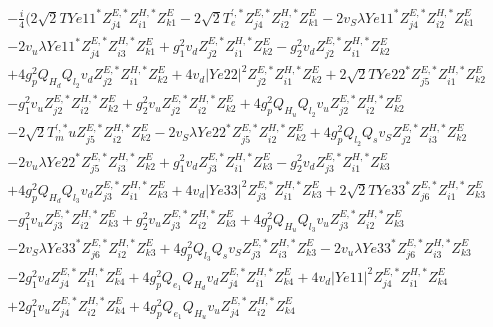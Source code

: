 \begin{align} 
 &-\frac{i}{4} \Big(2 \sqrt{2} TYe11^* Z^{E,*}_{j 4} Z^{H,*}_{i 1} Z_{{k 1}}^{E} -2 \sqrt{2} T^{{\prime},*}_e Z^{E,*}_{j 4} Z^{H,*}_{i 2} Z_{{k 1}}^{E} -2 v_S \lambda Ye11^* Z^{E,*}_{j 4} Z^{H,*}_{i 2} Z_{{k 1}}^{E} \nonumber \\ 
 &-2 v_u \lambda Ye11^* Z^{E,*}_{j 4} Z^{H,*}_{i 3} Z_{{k 1}}^{E} +g_{1}^{2} v_d Z^{E,*}_{j 2} Z^{H,*}_{i 1} Z_{{k 2}}^{E} - g_{2}^{2} v_d Z^{E,*}_{j 2} Z^{H,*}_{i 1} Z_{{k 2}}^{E} \nonumber \\ 
 &+4 g_{p}^{2} Q_{H_d} Q_{l_2} v_d Z^{E,*}_{j 2} Z^{H,*}_{i 1} Z_{{k 2}}^{E} +4 v_d |Ye22|^2 Z^{E,*}_{j 2} Z^{H,*}_{i 1} Z_{{k 2}}^{E} +2 \sqrt{2} TYe22^* Z^{E,*}_{j 5} Z^{H,*}_{i 1} Z_{{k 2}}^{E} \nonumber \\ 
 &- g_{1}^{2} v_u Z^{E,*}_{j 2} Z^{H,*}_{i 2} Z_{{k 2}}^{E} +g_{2}^{2} v_u Z^{E,*}_{j 2} Z^{H,*}_{i 2} Z_{{k 2}}^{E} +4 g_{p}^{2} Q_{H_u} Q_{l_2} v_u Z^{E,*}_{j 2} Z^{H,*}_{i 2} Z_{{k 2}}^{E} \nonumber \\ 
 &-2 \sqrt{2} T^{{\prime},*}_mu Z^{E,*}_{j 5} Z^{H,*}_{i 2} Z_{{k 2}}^{E} -2 v_S \lambda Ye22^* Z^{E,*}_{j 5} Z^{H,*}_{i 2} Z_{{k 2}}^{E} +4 g_{p}^{2} Q_{l_2} Q_s v_S Z^{E,*}_{j 2} Z^{H,*}_{i 3} Z_{{k 2}}^{E} \nonumber \\ 
 &-2 v_u \lambda Ye22^* Z^{E,*}_{j 5} Z^{H,*}_{i 3} Z_{{k 2}}^{E} +g_{1}^{2} v_d Z^{E,*}_{j 3} Z^{H,*}_{i 1} Z_{{k 3}}^{E} - g_{2}^{2} v_d Z^{E,*}_{j 3} Z^{H,*}_{i 1} Z_{{k 3}}^{E} \nonumber \\ 
 &+4 g_{p}^{2} Q_{H_d} Q_{l_3} v_d Z^{E,*}_{j 3} Z^{H,*}_{i 1} Z_{{k 3}}^{E} +4 v_d |Ye33|^2 Z^{E,*}_{j 3} Z^{H,*}_{i 1} Z_{{k 3}}^{E} +2 \sqrt{2} TYe33^* Z^{E,*}_{j 6} Z^{H,*}_{i 1} Z_{{k 3}}^{E} \nonumber \\ 
 &- g_{1}^{2} v_u Z^{E,*}_{j 3} Z^{H,*}_{i 2} Z_{{k 3}}^{E} +g_{2}^{2} v_u Z^{E,*}_{j 3} Z^{H,*}_{i 2} Z_{{k 3}}^{E} +4 g_{p}^{2} Q_{H_u} Q_{l_3} v_u Z^{E,*}_{j 3} Z^{H,*}_{i 2} Z_{{k 3}}^{E} \nonumber \\ 
 &-2 v_S \lambda Ye33^* Z^{E,*}_{j 6} Z^{H,*}_{i 2} Z_{{k 3}}^{E} +4 g_{p}^{2} Q_{l_3} Q_s v_S Z^{E,*}_{j 3} Z^{H,*}_{i 3} Z_{{k 3}}^{E} -2 v_u \lambda Ye33^* Z^{E,*}_{j 6} Z^{H,*}_{i 3} Z_{{k 3}}^{E} \nonumber \\ 
 &-2 g_{1}^{2} v_d Z^{E,*}_{j 4} Z^{H,*}_{i 1} Z_{{k 4}}^{E} +4 g_{p}^{2} Q_{e_{1}} Q_{H_d} v_d Z^{E,*}_{j 4} Z^{H,*}_{i 1} Z_{{k 4}}^{E} +4 v_d |Ye11|^2 Z^{E,*}_{j 4} Z^{H,*}_{i 1} Z_{{k 4}}^{E} \nonumber \\ 
 &+2 g_{1}^{2} v_u Z^{E,*}_{j 4} Z^{H,*}_{i 2} Z_{{k 4}}^{E} +4 g_{p}^{2} Q_{e_{1}} Q_{H_u} v_u Z^{E,*}_{j 4} Z^{H,*}_{i 2} Z_{{k 4}}^{E} \nonumber \\ 

\end{align}
